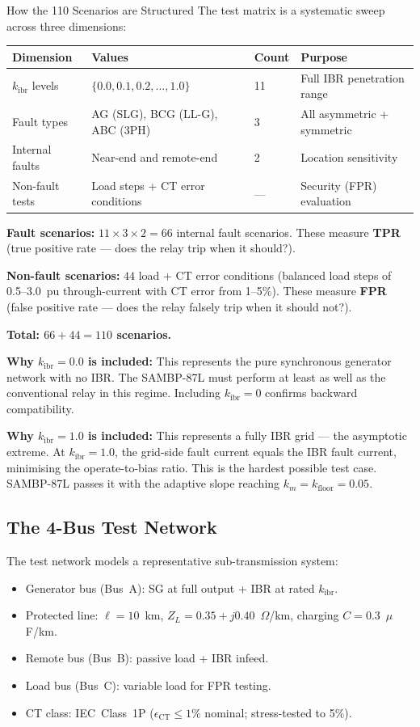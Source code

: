 \documentclass[12pt,a4paper]{article}
\newcommand{\kibr}{k_\mathrm{ibr}}
\begin{document}
\begin{archbox}{How the 110 Scenarios are Structured}
The test matrix is a systematic sweep across three dimensions:

\medskip
\begin{tabular}{@{}llll@{}}
\toprule
\textbf{Dimension} & \textbf{Values} & \textbf{Count} & \textbf{Purpose} \\
\midrule
$\kibr$ levels   & $\{0.0, 0.1, 0.2, \ldots, 1.0\}$ & 11 & Full IBR penetration range \\
Fault types      & AG (SLG), BCG (LL-G), ABC (3PH)  & 3  & All asymmetric + symmetric \\
Internal faults  & Near-end and remote-end           & 2  & Location sensitivity \\
Non-fault tests  & Load steps + CT error conditions  & --- & Security (FPR) evaluation \\
\bottomrule
\end{tabular}

\medskip
\textbf{Fault scenarios:} $11 \times 3 \times 2 = 66$ internal fault scenarios. These measure \textbf{TPR} (true positive rate --- does the relay trip when it should?).

\textbf{Non-fault scenarios:} $44$ load + CT error conditions (balanced load steps of 0.5--3.0~pu through-current with CT error from 1--5\%). These measure \textbf{FPR} (false positive rate --- does the relay falsely trip when it should not?).

\textbf{Total: $66 + 44 = 110$ scenarios.}

\medskip
\textbf{Why $\kibr = 0.0$ is included:} This represents the pure synchronous generator network with no IBR. The SAMBP-87L must perform at least as well as the conventional relay in this regime. Including $\kibr = 0$ confirms backward compatibility.

\textbf{Why $\kibr = 1.0$ is included:} This represents a fully IBR grid --- the asymptotic extreme. At $\kibr = 1.0$, the grid-side fault current equals the IBR fault current, minimising the operate-to-bias ratio. This is the hardest possible test case. SAMBP-87L passes it with the adaptive slope reaching $k_m = k_\mathrm{floor} = 0.05$.
\end{archbox}

\subsection{The 4-Bus Test Network}

The test network models a representative sub-transmission system:
\begin{itemize}[nosep]
  \item Generator bus (Bus~A): SG at full output + IBR at rated $\kibr$.
  \item Protected line: $\ell = 10$~km, $Z_L = 0.35 + j0.40$~$\Omega$/km, charging $C = 0.3$~$\mu$F/km.
  \item Remote bus (Bus~B): passive load + IBR infeed.
  \item Load bus (Bus~C): variable load for FPR testing.
  \item CT class: IEC~Class~1P ($\epsilon_\mathrm{CT} \leq 1\%$ nominal; stress-tested to 5\%).
\end{itemize}
\end{document}
